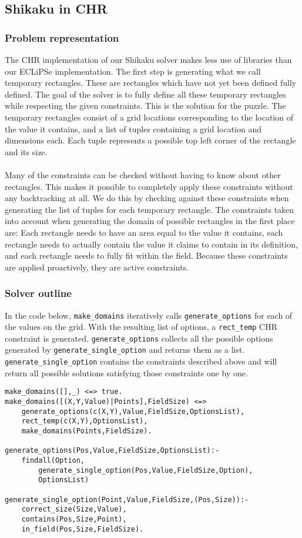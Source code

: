 \subsection{Shikaku in CHR}
\subsubsection{Problem representation}
The CHR implementation of our Shikaku solver makes less use of libraries than our ECLiPSe implementation. The first step is generating what we call temporary rectangles. These are rectangles which have not yet been defined fully defined. The goal of the solver is to fully define all these temporary rectangles while respecting the given constraints. This is the solution for the puzzle. The temporary rectangles consist of a grid locations corresponding to the location of the value it contains, and a list of tuples containing a grid location and dimensions each. Each tuple represents a possible top left corner of the rectangle and its size. 
\\ \\
Many of the constraints can be checked without having to know about other rectangles. This makes it possible to completely apply these constraints without any backtracking at all. We do this by checking against these constraints when generating the list of tuples for each temporary rectangle. The constraints taken into account when generating the domain of possible rectangles in the first place are: Each rectangle needs to have an area equal to the value it contains, each rectangle needs to actually contain the value it claims to contain in its definition, and each rectangle needs to fully fit within the field. Because these constraints are applied proactively, they are active constraints.

\subsubsection{Solver outline}
In the code below,  \texttt{make\_domains} iteratively calls \texttt{generate\_options} for each of the values on the grid. With the resulting list of options, a \texttt{rect\_temp} CHR constraint is generated. \texttt{generate\_options} collects all the possible options generated by \texttt{generate\_single\_option} and returns them as a list. \texttt{generate\_single\_option} contains the constraints described above and will return all possible solutions satisfying those constraints one by one. 

\begin{lstlisting}
make_domains([],_) <=> true.
make_domains([(X,Y,Value)|Points],FieldSize) <=>
	generate_options(c(X,Y),Value,FieldSize,OptionsList),
	rect_temp(c(X,Y),OptionsList),
	make_domains(Points,FieldSize).
	
generate_options(Pos,Value,FieldSize,OptionsList):-
    findall(Option,
		generate_single_option(Pos,Value,FieldSize,Option),
		OptionsList)
		
generate_single_option(Point,Value,FieldSize,(Pos,Size)):-
	correct_size(Size,Value),
	contains(Pos,Size,Point),
	in_field(Pos,Size,FieldSize).
\end{lstlisting}

